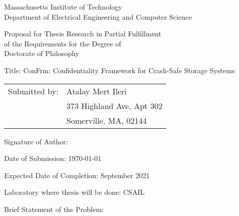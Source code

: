 \begin{spacing}{1}
  \begin{titlepage}
    \begin{center}
      Massachusetts Institute of Technology\\
      Department of Electrical Engineering and Computer Science%
    \end{center}

    \begin{center}
      Proposal for Thesis Research in Partial Fulfillment\\
      of the Requirements for the Degree of\\
      Doctorate of Philosophy%
    \end{center}

    \begin{flushleft}
    Title: ConFrm: Confidentiality Framework for Crash-Safe Storage Systems

    \vspace{\baselineskip}
    \begin{tabular}{@{}ll}
      Submitted by: & Atalay Mert Ileri\\
      &373 Highland Ave, Apt 302\\
      &Somerville, MA, 02144\\
    \end{tabular}

    \vspace{\baselineskip}
    \vspace{\baselineskip}
    Signature of Author: 
    \begin{comment}
    	\makebox[2.5in]{
    	\begin{minipage}[t]{150pt}
    	\vspace{-1cm}
    	\texttt{[image: ./signature.pdf]}
    	\end{minipage}
    	}
    \end{comment}
    
    \vspace{\baselineskip}
    Date of Submission: \today

    \vspace{\baselineskip}
    Expected Date of Completion: September 2021

    \vspace{\baselineskip}
    Laboratory where thesis will be done: CSAIL

    \vspace{\baselineskip}
    Brief Statement of the Problem:
    \end{flushleft}


\end{titlepage}
\end{spacing}
